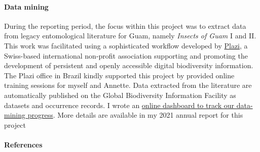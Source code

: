 \begin{refsection}
	\paragraph{Data mining} During the reporting period, the focus within this project was to extract data from legacy entomological literature for Guam, namely \textit{Insects of Guam} I and II. This work was facilitated using a sophisticated workflow developed by \href{https://en.wikipedia.org/wiki/Plazi}{Plazi}, a Swiss-based international non-profit association supporting and promoting the development of persistent and openly accessible digital biodiversity information. The Plazi office in Brazil kindly supported this project by provided online training sessions for myself and Annette. Data extracted from the literature are automatically published on the Global Biodiversity Information Facility as datasets and occurrence records. I wrote an \href{https://aubreymoore.github.io/data-mining-insects-of-guam/MatCit-Validator/status_report.html}{online dashboard to track our data-mining progress}. More details are available in my 2021 annual report for this project \cite{moore_guam_2021}
\begin{comment}	
\paragraph{Plans for 15JUN2021-14JUN2022}
I am working to complete this project before the grant expires on 2022-09-30 and to complete a final report due 2022-12-31.

\paragraph{Plans for 15JUN2022-14JUN2023}
I am working to complete this project before the grant expires on 2022-09-30 and to complete a final report due 2022-12-31.
\end{comment}
	\paragraph{References}
	\printbibliography[heading=none]
\end{refsection}

